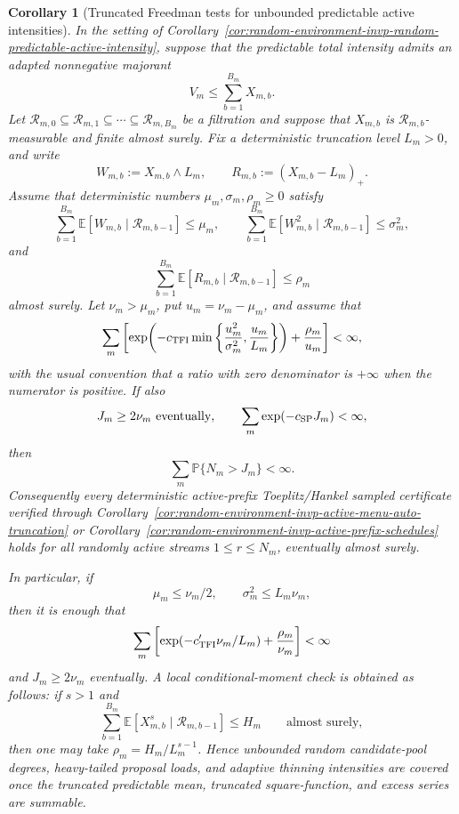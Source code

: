 \documentclass[11pt]{amsart}
\numberwithin{equation}{section}
\newtheorem{corollary}[theorem]{Corollary}
\theoremstyle{definition}
\theoremstyle{remark}
\newcommand{\Prob}{\mathbb P}
\newcommand{\Exp}{\mathbb E}
\begin{document}
\begin{corollary}[Truncated Freedman tests for unbounded predictable active intensities]
\label{cor:random-environment-invp-truncated-freedman-predictable-active-intensity}
In the setting of
Corollary~\ref{cor:random-environment-invp-random-predictable-active-intensity},
suppose that the predictable total intensity admits an adapted nonnegative
majorant
\[
  V_m\le\sum_{b=1}^{B_m}X_{m,b}.
\]
Let
\(\mathcal R_{m,0}\subseteq\mathcal R_{m,1}\subseteq\cdots\subseteq
\mathcal R_{m,B_m}\) be a filtration and suppose that \(X_{m,b}\) is
\(\mathcal R_{m,b}\)-measurable and finite almost surely.  Fix a deterministic
truncation level \(L_m>0\), and write
\[
  W_{m,b}:=X_{m,b}\wedge L_m,\qquad
  R_{m,b}:=(X_{m,b}-L_m)_+ .
\]
Assume that deterministic numbers \(\mu_m,\sigma_m,\rho_m\ge0\) satisfy
\[
  \sum_{b=1}^{B_m}
  \Exp[W_{m,b}\mid\mathcal R_{m,b-1}]\le\mu_m,\qquad
  \sum_{b=1}^{B_m}
  \Exp[W_{m,b}^2\mid\mathcal R_{m,b-1}]\le\sigma_m^2,
\]
and
\[
  \sum_{b=1}^{B_m}
  \Exp[R_{m,b}\mid\mathcal R_{m,b-1}]\le\rho_m
\]
almost surely.  Let \(\nu_m>\mu_m\), put \(u_m=\nu_m-\mu_m\), and assume that
\[
  \sum_m
  \left[
  \exp\!\left(
    -c_{\rm TFI}\min\left\{\frac{u_m^2}{\sigma_m^2},
                          \frac{u_m}{L_m}\right\}
  \right)
  +\frac{\rho_m}{u_m}
  \right]<\infty,
\]
with the usual convention that a ratio with zero denominator is \(+\infty\)
when the numerator is positive.  If also
\[
  J_m\ge2\nu_m\ \text{eventually},
  \qquad
  \sum_m\exp(-c_{\rm SP}J_m)<\infty,
\]
then
\[
  \sum_m\Prob\{N_m>J_m\}<\infty .
\]
Consequently every deterministic active-prefix Toeplitz/Hankel sampled
certificate verified through
Corollary~\ref{cor:random-environment-invp-active-menu-auto-truncation} or
Corollary~\ref{cor:random-environment-invp-active-prefix-schedules} holds for
all randomly active streams \(1\le r\le N_m\), eventually almost surely.

In particular, if
\[
  \mu_m\le\nu_m/2,\qquad
  \sigma_m^2\le L_m\nu_m,
\]
then it is enough that
\[
  \sum_m\left[
    \exp(-c'_{\rm TFI}\nu_m/L_m)+\frac{\rho_m}{\nu_m}
  \right]<\infty
\]
and \(J_m\ge2\nu_m\) eventually.  A local conditional-moment check is obtained
as follows: if \(s>1\) and
\[
  \sum_{b=1}^{B_m}
  \Exp[X_{m,b}^s\mid\mathcal R_{m,b-1}]\le H_m
  \qquad\text{almost surely},
\]
then one may take \(\rho_m=H_m/L_m^{s-1}\).  Hence unbounded random
candidate-pool degrees, heavy-tailed proposal loads, and adaptive thinning
intensities are covered once the truncated predictable mean, truncated
square-function, and excess series are summable.
\end{corollary}
\end{document}
